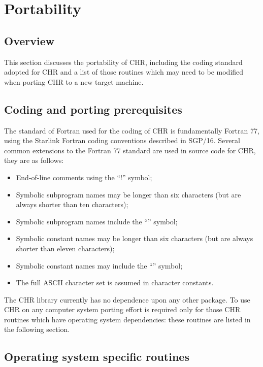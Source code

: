 \documentclass[twoside,11pt]{article}
\renewcommand{\_}{\texttt{\symbol{95}}}
\begin{document}
\newpage

\section {Portability}

\subsection {Overview}

This section discusses the portability of CHR, including the coding 
standard adopted for CHR and a list of those routines which 
may need to be modified when porting CHR to a new target machine.


\subsection {Coding and porting prerequisites}

The standard of Fortran used for the coding of CHR is fundamentally
Fortran 77, using the Starlink Fortran coding conventions described in SGP/16.
Several common extensions to the Fortran 77 standard are used in source 
code for CHR, they are as follows:

\begin {itemize}
\item End-of-line comments using the ``!'' symbol;
\item Symbolic subprogram names may be longer than six characters (but are 
always shorter than ten characters);
\item Symbolic subprogram names include the ``\_'' symbol;
\item Symbolic constant names may be longer than six characters (but are always
shorter than eleven characters);
\item Symbolic constant names may include the ``\_'' symbol;
\item The full ASCII character set is assumed in character constants.
\end {itemize}

The CHR library currently has no dependence upon any other package.
To use CHR on any computer system porting effort is required only for those 
CHR routines which have operating system dependencies: these routines are
listed in the following section.


\subsection {Operating system specific routines}
\end{document}
